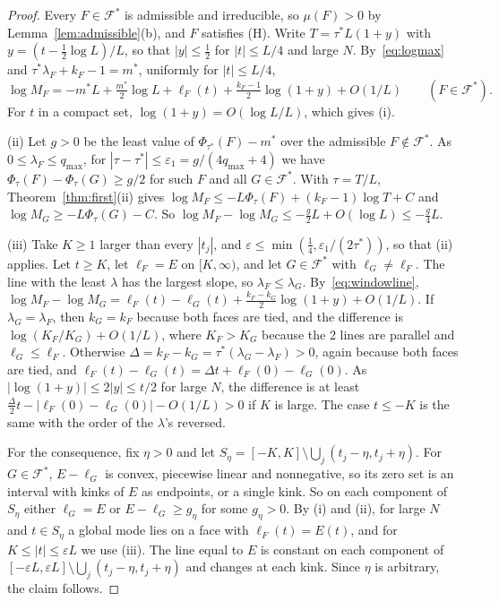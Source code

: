 \begin{proof}
Every $F\in\mathcal F^*$ is admissible and irreducible, so $\mu(F)>0$ by
Lemma~\ref{lem:admissible}(b), and $F$ satisfies (H). Write
$T=\tau^*L(1+y)$ with $y=(t-\frac12\log L)/L$, so that $|y|\le\frac12$ for
$|t|\le L/4$ and large $N$. By~\eqref{eq:logmax} and
$\tau^*\lambda_F+k_F-1=m^*$, uniformly for $|t|\le L/4$,
\begin{equation}\label{eq:windowline}
\log M_F=-m^*L+\tfrac{m^*}2\log L+\ell_F(t)+\tfrac{k_F-1}2\log(1+y)+O(1/L)
\qquad(F\in\mathcal F^*).
\end{equation}
For $t$ in a compact set, $\log(1+y)=O(\log L/L)$, which gives (i).

(ii) Let $g>0$ be the least value of $\Phi_{\tau^*}(F)-m^*$ over the admissible
$F\notin\mathcal F^*$. As $0\le\lambda_F\le q_{\max}$, for
$|\tau-\tau^*|\le\varepsilon_1=g/(4q_{\max}+4)$ we have
$\Phi_\tau(F)-\Phi_\tau(G)\ge g/2$ for such $F$ and all $G\in\mathcal F^*$.
With $\tau=T/L$, Theorem~\ref{thm:first}(ii) gives
$\log M_F\le-L\Phi_\tau(F)+(k_F-1)\log T+C$ and $\log M_G\ge-L\Phi_\tau(G)-C$.
So $\log M_F-\log M_G\le-\frac g2L+O(\log L)\le-\frac g4L$.

(iii) Take $K\ge1$ larger than every $|t_j|$, and
$\varepsilon\le\min(\frac14,\varepsilon_1/(2\tau^*))$, so that (ii) applies.
Let $t\ge K$, let $\ell_F=E$ on $[K,\infty)$, and let $G\in\mathcal F^*$ with
$\ell_G\ne\ell_F$. The line with the least $\lambda$ has the largest slope, so
$\lambda_F\le\lambda_G$. By~\eqref{eq:windowline},
$\log M_F-\log M_G=\ell_F(t)-\ell_G(t)+\frac{k_F-k_G}2\log(1+y)+O(1/L)$. If
$\lambda_G=\lambda_F$, then $k_G=k_F$ because both faces are tied, and the
difference is $\log(K_F/K_G)+O(1/L)$, where $K_F>K_G$ because the 2 lines
are parallel and $\ell_G\le\ell_F$. Otherwise
$\Delta=k_F-k_G=\tau^*(\lambda_G-\lambda_F)>0$, again because both faces are
tied, and $\ell_F(t)-\ell_G(t)=\Delta t+\ell_F(0)-\ell_G(0)$. As
$|\log(1+y)|\le2|y|\le t/2$ for large $N$, the difference is at least
$\frac\Delta2t-|\ell_F(0)-\ell_G(0)|-O(1/L)>0$ if $K$ is large. The case
$t\le-K$ is the same with the order of the $\lambda$'s reversed.

For the consequence, fix $\eta>0$ and let
$S_\eta=[-K,K]\setminus\bigcup_j(t_j-\eta,t_j+\eta)$. For $G\in\mathcal F^*$,
$E-\ell_G$ is convex, piecewise linear and nonnegative, so its zero set is an
interval with kinks of $E$ as endpoints, or a single kink. So on each
component of $S_\eta$ either $\ell_G=E$ or $E-\ell_G\ge g_\eta$ for some
$g_\eta>0$. By (i) and (ii), for large $N$ and $t\in S_\eta$ a global mode
lies on a face with $\ell_F(t)=E(t)$, and for $K\le|t|\le\varepsilon L$ we use
(iii). The line equal to $E$ is constant on each component of
$[-\varepsilon L,\varepsilon L]\setminus\bigcup_j(t_j-\eta,t_j+\eta)$ and
changes at each kink. Since $\eta$ is arbitrary, the claim follows.
\end{proof}

